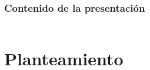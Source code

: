 \documentclass[dvipsnames]{beamer}
\begin{document}
\begin{frame}
	\frametitle{Contenido de la presentación}
	\begin{columns}
		\begin{column}{0.5\textwidth}
			\tableofcontents[sections={1-6}]  %
		\end{column}
		\begin{column}{0.5\textwidth}
			\tableofcontents[sections={7-12}]
		\end{column}
	\end{columns}
\end{frame}


	\section{Planteamiento}
 
\end{document}
